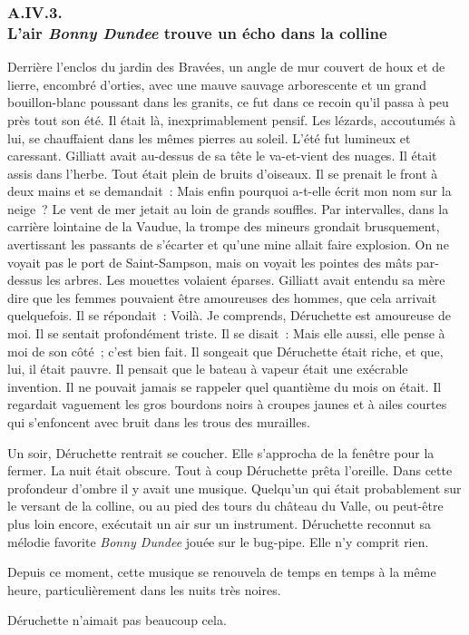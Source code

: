 \documentclass[french,twoside]{book} %
\begin{document}
 \subsubsection[{A.IV.3. L’air Bonny Dundee trouve un écho dans la colline}]{A.IV.3. \\
L’air \emph{Bonny Dundee} trouve un écho dans la colline}
\noindent Derrière l’enclos du jardin des Bravées, un angle de mur couvert de houx et de lierre, encombré d’orties, avec une mauve sauvage arborescente et un grand bouillon-blanc poussant dans les granits, ce fut dans ce recoin qu’il passa à peu près tout son été. Il était là, inexprimablement pensif. Les lézards, accoutumés à lui, se chauffaient dans les mêmes pierres au soleil. L’été fut lumineux et caressant. Gilliatt avait au-dessus de sa tête le va-et-vient des nuages. Il était assis dans l’herbe. Tout était plein de bruits d’oiseaux. Il se prenait le front à deux mains et se demandait : Mais enfin pourquoi a-t-elle écrit mon nom sur la neige ? Le vent de mer jetait au loin de grands souffles. Par intervalles, dans la carrière lointaine de la Vaudue, la trompe des mineurs grondait brusquement, avertissant les passants de s’écarter et qu’une mine allait faire explosion. On ne voyait pas le port de Saint-Sampson, mais on  voyait les pointes des mâts par-dessus les arbres. Les mouettes volaient éparses. Gilliatt avait entendu sa mère dire que les femmes pouvaient être amoureuses des hommes, que cela arrivait quelquefois. Il se répondait : Voilà. Je comprends, Déruchette est amoureuse de moi. Il se sentait profondément triste. Il se disait : Mais elle aussi, elle pense à moi de son côté ; c’est bien fait. Il songeait que Déruchette était riche, et que, lui, il était pauvre. Il pensait que le bateau à vapeur était une exécrable invention. Il ne pouvait jamais se rappeler quel quantième du mois on était. Il regardait vaguement les gros bourdons noirs à croupes jaunes et à ailes courtes qui s’enfoncent avec bruit dans les trous des murailles.\par
Un soir, Déruchette rentrait se coucher. Elle s’approcha de la fenêtre pour la fermer. La nuit était obscure. Tout à coup Déruchette prêta l’oreille. Dans cette profondeur d’ombre il y avait une musique. Quelqu’un qui était probablement sur le versant de la colline, ou au pied des tours du château du Valle, ou peut-être plus loin encore, exécutait un air sur un instrument. Déruchette reconnut sa mélodie favorite \emph{Bonny Dundee} jouée sur le bug-pipe. Elle n’y comprit rien.\par
Depuis ce moment, cette musique se renouvela de temps en temps à la même heure, particulièrement dans les nuits très noires.\par
Déruchette n’aimait pas beaucoup cela.
\end{document}
